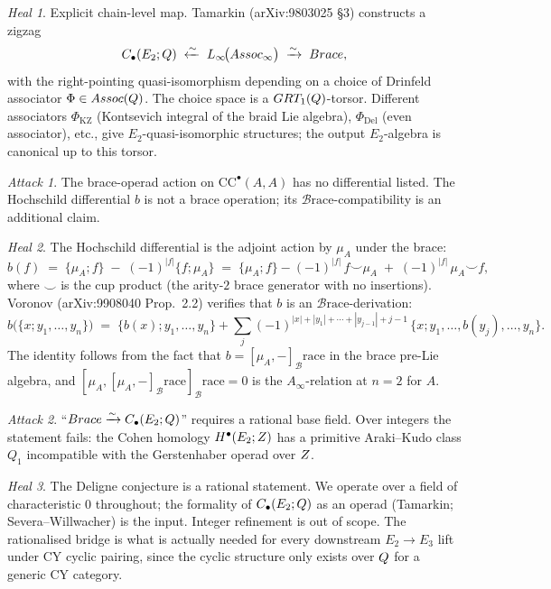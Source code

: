 \documentclass[11pt]{article}
\theoremstyle{definition}
\theoremstyle{remark}
\newtheorem*{attack}{Attack}
\newtheorem*{heal}{Heal}
\newcommand{\CC}{\mathrm{CC}}
\newcommand{\Br}{\mathcal{B}\mathrm{race}}
\newcommand{\Ainf}{A_{\infty}}
\begin{document}
\begin{heal}
Explicit chain-level map. Tamarkin (arXiv:9803025 \S3) constructs a
zigzag
\[
 C_\bullet(E_2;\Q) \;\xleftarrow{\sim}\;
 \mathrm{L}_\infty\!\bigl(\mathrm{Assoc}_\infty\bigr) \;\xrightarrow{\sim}\;
 \Br,
\]
with the right-pointing quasi-isomorphism depending on a choice of
Drinfeld associator $\Phi \in Assoc(Q)$. The choice space
is a $GRT_1(Q)$-torsor. Different associators $\Phi_{\mathrm{KZ}}$
(Kontsevich integral of the braid Lie algebra), $\Phi_{\mathrm{Del}}$
(even associator), etc., give $E_2$-quasi-isomorphic structures; the
output $E_2$-algebra is canonical up to this torsor.
\end{heal}

\begin{attack}
The brace-operad action on $\CC^\bullet(A,A)$ has no differential
listed. The Hochschild differential $b$ is not a brace operation; its
$\Br$-compatibility is an additional claim.
\end{attack}

\begin{heal}
The Hochschild differential is the adjoint action by $\mu_A$ under
the brace:
\[
 b(f) \;=\; \{\mu_A; f\} \;-\; (-1)^{|f|}\{f; \mu_A\}
 \;=\; \{\mu_A;f\} - (-1)^{|f|}\, f \smile \mu_A
 \;+\; (-1)^{|f|}\, \mu_A \smile f,
\]
where $\smile$ is the cup product (the arity-$2$ brace generator
with no insertions). Voronov (arXiv:9908040 Prop.~2.2) verifies that
$b$ is an $\Br$-derivation:
\[
 b\bigl(\{x; y_1, \ldots, y_n\}\bigr)
 \;=\; \{b(x); y_1, \ldots, y_n\}
 + \sum_j (-1)^{|x| + |y_1| + \cdots + |y_{j-1}| + j - 1}\,
 \{x; y_1, \ldots, b(y_j), \ldots, y_n\}.
\]
The identity follows from the fact that $b = [\mu_A, -]_\Br$ in the
brace pre-Lie algebra, and $[\mu_A, [\mu_A, -]_\Br]_\Br = 0$ is the
$\Ainf$-relation at $n=2$ for $A$.
\end{heal}

\begin{attack}
``$\Br \xrightarrow{\sim} C_\bullet(E_2;\Q)$'' requires a rational
base field. Over integers the statement fails: the Cohen homology
$H^\bullet(E_2;Z)$ has a primitive Araki--Kudo class $Q_1$
incompatible with the Gerstenhaber operad over $Z$.
\end{attack}

\begin{heal}
The Deligne conjecture is a rational statement. We operate over a
field of characteristic $0$ throughout; the formality of
$C_\bullet(E_2;Q)$ as an operad (Tamarkin; Severa--Willwacher) is
the input. Integer refinement is out of scope. The rationalised
bridge is what is actually needed for every downstream $E_2 \to E_3$
lift under CY cyclic pairing, since the cyclic structure only exists
over $Q$ for a generic CY category.
\end{heal}
\end{document}
